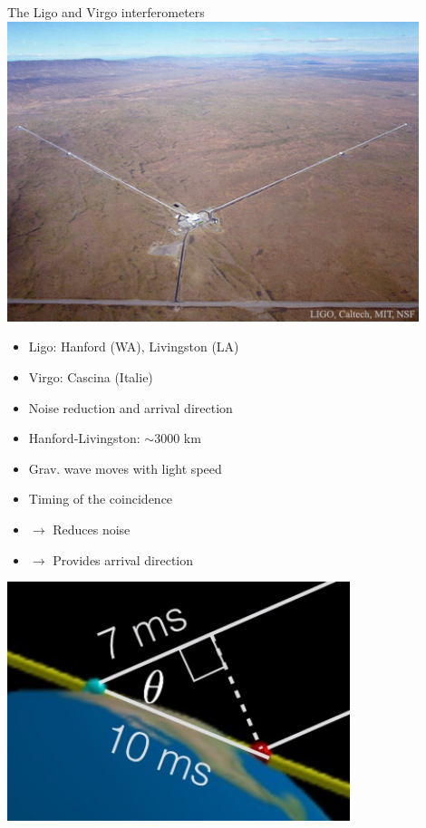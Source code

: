 \newpage
%
\begin{center}
{\blue The Ligo and Virgo interferometers}\\[3mm]
\includegraphics[keepaspectratio,width=12cm]{hanford-ligo}
\end{center}
%
\begin{itemize}
\item[] Ligo: Hanford (WA), Livingston (LA)
\item[] Virgo: Cascina (Italie)
\end{itemize}

\Tr
{}%
\begin{itemize}
\item[] \begin{center}{\blue Noise reduction and arrival direction}\end{center}
\item Hanford-Livingston: $\sim$3000 km
\item Grav. wave moves with light speed
\item Timing of the  coincidence
\item[] $\rightarrow$ Reduces noise
\item[] $\rightarrow$ Provides arrival direction
\end{itemize}
%
\begin{center}
\includegraphics[keepaspectratio,width=10cm]{ligo-dt}
\end{center}


